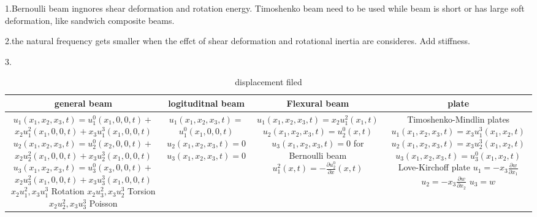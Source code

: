 \documentclass{article}
\begin{document}
\begin{multicols*}{3}
1.Bernoulli beam ingnores shear deformation and rotation energy. Timoshenko beam need to be used while beam is short or has large soft deformation, like sandwich composite beams.

2.the natural frequency gets smaller when the effct of shear deformation and rotational inertia are consideres. Add stiffness.

3.

\begin{table*}
  \centering
  \caption{displacement filed}
  \begin{tabular}{|c|c|c|c|}
    \hline
    general beam & logituditnal beam  & Flexural beam & plate\\
    \hline
    \makecell[c]{
      $u_{1}(x_{1},x_{2},x_{3},t)=u_{1}^{0}(x_{1},0,0,t)+$\\$x_{2}u_{1}^{2}(x_{1},0,0,t)+x_{3}u_{1}^{3}(x_{1},0,0,t)$\\
      $u_{2}(x_{1},x_{2},x_{3},t)=u_{2}^{0}(x_{2},0,0,t)+$\\$x_{2}u_{2}^{2}(x_{1},0,0,t)+x_{3}u_{2}^{3}(x_{1},0,0,t)$\\
      $u_{3}(x_{1},x_{2},x_{3},t)=u_{3}^{0}(x_{3},0,0,t)+$\\$x_{2}u_{3}^{2}(x_{1},0,0,t)+x_{3}u_{3}^{3}(x_{1},0,0,t)$\\
      $x_{2}u_1^2, x_{3}u_1^3$ Rotation \\
      $x_{2}u_3^2, x_{3}u_2^3$ Torsion \\
      $x_{2}u_2^2, x_{3}u_3^3$ Poisson
    }
    &\makecell[c]{
      $u_{1}(x_{1},x_{2},x_{3},t)=$\\$u_{1}^{0}(x_{1},0,0,t)$\\
      $u_{2}(x_{1},x_{2},x_{3},t)=0$\\
      $u_{3}(x_{1},x_{2},x_{3},t)=0$\\
    }
    &\makecell[c]{
      $u_{1}(x_{1},x_{2},x_{3},t)=x_{2}u_{1}^{2}(x_{1},t)$\\
      $u_{2}(x_{1},x_{2},x_{3},t)=u_{2}^{0}(x,t)$\\
      $u_{3}(x_{1},x_{2},x_{3},t)=0$\\
      for Bernoulli beam \\
      $u_{1}^{2}(x,t)=-\frac{\partial u_{2}^{0}}{\partial x}(x,t)$
    }
    &\makecell[c]{
      Timoshenko-Mindlin plates\\
      $u_{1}(x_{1},x_{2},x_{3},t)=x_{3}u_{1}^{3}(x_{1},x_{2},t)$\\
      $u_{2}(x_{1},x_{2},x_{3},t)=x_{3}u_{2}^{3}(x_{1},x_{2},t)$\\
      $u_{3}(x_{1},x_{2},x_{3},t)=u_{3}^{0}(x_{1},x_{2},t)$\\
      Love-Kirchoff plate\\
      $u_{1}=-x_{3}\frac{\partial w}{\partial x_{1}}$\\
      $u_{2}=-x_{3}\frac{\partial w}{\partial x_{2}}$\\
      $u_{3}=w$
    }\\
    \hline
  \end{tabular}
\end{table*}


\end{multicols*}
\end{document}
